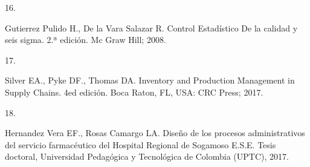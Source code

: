 \documentclass[
]{book}
\newlength{\cslhangindent}
\newlength{\csllabelwidth}
\newlength{\cslentryspacingunit} %
\newenvironment{CSLReferences}[2] %
 {%
  \setlength{\parindent}{0pt}
  \ifodd #1
  \let\oldpar\par
  \def\par{\hangindent=\cslhangindent\oldpar}
  \fi
  \setlength{\parskip}{#2\cslentryspacingunit}
 }%
 {}
\newcommand{\CSLLeftMargin}[1]{\parbox[t]{\csllabelwidth}{#1}}
\newcommand{\CSLRightInline}[1]{\parbox[t]{\linewidth - \csllabelwidth}{#1}\break}
\begin{document}
\begin{CSLReferences}{0}{0}
\leavevmode{}%
\CSLLeftMargin{16. }
\CSLRightInline{Gutierrez Pulido H., De la Vara Salazar R. {Control Estad{í}stico De la calidad y seis sigma}. 2.ª edición. Mc Graw Hill; 2008.}

\leavevmode{}%
\CSLLeftMargin{17. }
\CSLRightInline{Silver EA., Pyke DF., Thomas DA. {Inventory and Production Management in Supply Chains}. 4ed edición. Boca Raton, FL, USA: CRC Press; 2017.}

\leavevmode{}%
\CSLLeftMargin{18. }
\CSLRightInline{Hernandez Vera EF., Rosas Camargo LA. {Dise{ñ}o de los procesos administrativos del servicio farmac{é}utico del Hospital Regional de Sogamoso E.S.E.} Tesis doctoral, Universidad Pedag{ó}gica y Tecnol{ó}gica de Colombia (UPTC), 2017.}

\end{CSLReferences}
\end{document}
